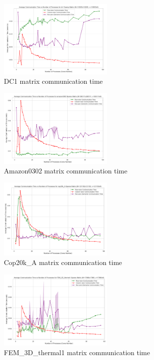 \documentclass[12pt,oneside]{book} %
\begin{document}
\begin{figure}[H]
    \centering
    \includegraphics[width=0.5\textwidth]{../results/matrix_dim/dc1_k6_communication_time.png}
    \caption{DC1 matrix communication time}\label{fig:dc1-k6-communication-time}
\end{figure}

\begin{figure}[H]
    \centering
    \includegraphics[width=0.5\textwidth]{../results/matrix_dim/amazon0302_k6_communication_time.png}
    \caption{Amazon0302 matrix communication time}\label{fig:amazon0302-k6-communication-time}
\end{figure}

\begin{figure}[H]
    \centering
    \includegraphics[width=0.5\textwidth]{../results/matrix_dim/cop20k_A_k6_communication_time.png}
    \caption{Cop20k\_A matrix communication time}\label{fig:cop20k-a-k6-communication-time-1}
\end{figure}

\begin{figure}[H]
    \centering
    \includegraphics[width=0.5\textwidth]{../results/matrix_dim/FEM_3D_thermal1_k6_communication_time.png}
    \caption{FEM\_3D\_thermal1 matrix communication time}\label{fig:fem-3d-thermal1-k6-communication-time}
\end{figure}
\end{document}
